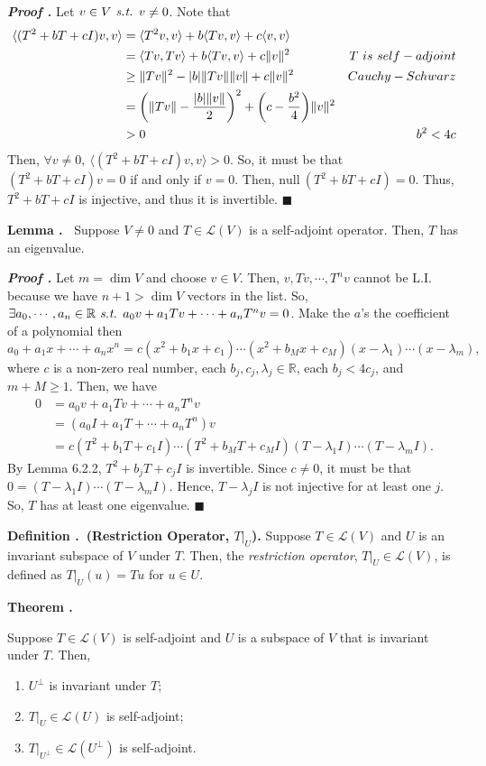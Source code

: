 \documentclass[11pt, letterpaper]{article}
\newcounter{index}[subsection]
\newenvironment*{df}[1]{\par\noindent\textbf{Definition \thesubsection.\stepcounter{index}\theindex\ (#1).}}{\par}
\newenvironment*{thm}[1]{\begin{tcolorbox}\par\noindent\textbf{Theorem \thesubsection.\stepcounter{index}\theindex\ #1} \par}{\par\end{tcolorbox}}
\newenvironment*{lem}[1]{\par\noindent\textbf{Lemma \thesubsection.\stepcounter{index}\theindex\ #1}}{\par}
\newcounter{nprf}[subsection]
\newenvironment*{prf}{\par\indent\textbf{\textit{Proof \stepcounter{nprf}\thenprf.}}}{\hfill$\blacksquare$\par}
\def\R{\mathbb{R}}
\def\L{\mathcal{L}}
\def\st{\emph{ s.t. }}
\def\LI{\mathrm{L.I.}}
\def\Null{\mathrm{null\ }}
\begin{document}
\begin{prf}
	Let $v\in V\st v\neq0$. Note that \[\begin{aligned}\langle(T^2+bT+cI)v,v\rangle&=\langle T^2v,v\rangle+b\langle Tv,v\rangle+c\langle v,v\rangle\\&=\langle Tv,Tv\rangle+b\langle Tv,v\rangle+c\|v\|^2&T\ is\ self-adjoint\\&\geq\|Tv\|^2-\qty|b|\|Tv\|\|v\|+c\|v\|^2&Cauchy-Schwarz\\&=\qty(\|Tv\|-\dfrac{\qty|b|\|v\|}{2})^2+\qty(c-\dfrac{b^2}{4})\|v\|^2\\&>0&b^2<4c\end{aligned}\] Then, $\forall v\neq0,\ \langle(T^2+bT+cI)v,v\rangle>0$. So, it must be that $(T^2+bT+cI)v=0$ if and only if $v=0$. Then, $\Null(T^2+bT+cI)=\qty{0}$. Thus, $T^2+bT+cI$ is injective, and thus it is invertible.
\end{prf}
\begin{lem}{}
	Suppose $V\neq\qty{0}$ and $T\in\L(V)$ is a self-adjoint operator. Then, $T$ has an eigenvalue. 	
\end{lem}
\begin{prf}
	Let $m=\dim V$ and choose $v\in V$. Then, $v,Tv,\cdots,T^nv$ cannot be $\LI$ because we have $n+1>\dim V$ vectors in the list. So, $\exists a_0,\cdots,a_n\in\R\st a_0v+a_1Tv+\cdots+a_nT^nv=0$. Make the $a$'s the coefficient of a polynomial then \[a_0+a_1x+\cdots+a_nx^n=c(x^2+b_1x+c_1)\cdots(x^2+b_Mx+c_M)(x-\lambda_1)\cdots(x-\lambda_m),\] where $c$ is a non-zero real number, each $b_j,c_j,\lambda_j\in\R$, each $b_j<4c_j$, and $m+M\geq1$. Then, we have \[\begin{aligned}0&=a_0v+a_1Tv+\cdots+a_nT^nv\\&=(a_0I+a_1T+\cdots+a_nT^n)v\\&=c(T^2+b_1T+c_1I)\cdots(T^2+b_MT+c_MI)(T-\lambda_1I)\cdots(T-\lambda_mI).\end{aligned}\] By Lemma 6.2.2,  $T^2+b_jT+c_jI$ is invertible. Since $c\neq0$, it must be that $0=(T-\lambda_1I)\cdots(T-\lambda_mI)$. Hence, $T-\lambda_jI$ is not injective for at least one $j$. So, $T$ has at least one eigenvalue. 
\end{prf}
\begin{df}{Restriction Operator, $T|_U$}
	Suppose $T\in\L(V)$ and $U$ is an invariant subspace of $V$ under $T$. Then, the \textit{restriction operator}, $T|_U\in\L(V)$, is defined as $T|_U(u)=Tu$ for $u\in U$.
\end{df}
\begin{thm}{}
	Suppose $T\in\L(V)$ is self-adjoint and $U$ is a subspace of $V$ that is invariant under $T$. Then, 
	\begin{enumerate}
		\item $U^\perp$ is invariant under $T$;
		\item $T|_U\in\L(U)$ is self-adjoint;
		\item $T|_{U^\perp}\in\L(U^\perp)$ is self-adjoint. 
	\end{enumerate}	
\end{thm}
\end{document}
